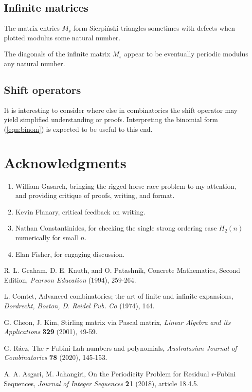 \documentclass[12pt,reqno]{article}
\begin{document}
\subsection{Infinite matrices}
The matrix entries $M_{s}$ form Sierpi\'nski triangles sometimes with defects when plotted modulus some natural number.

The diagonals of the infinite matrix $M_{s}$ appear to be eventually periodic modulus any natural number.
\subsection{Shift operators}
It is interesting to consider where else in combinatorics the shift operator may yield simplified understanding or proofs. Interpreting the binomial form (\ref{eqn:binom}) is expected to be useful to this end. 






\section{Acknowledgments}
\begin{enumerate}
	\item{William Gasarch, bringing the rigged horse race problem to my attention, and providing critique of proofs, writing, and format.}
	\item{Kevin Flanary, critical feedback on writing.}
	\item{Nathan Constantinides, for checking the single strong ordering case $H_{2}(n)$ numerically for small $n$.}
	\item{Elan Fisher, for engaging discussion.}
\end{enumerate}

\begin{thebibliography}{9}

R. L. Graham, D. E. Knuth, and O. Patashnik, Concrete Mathematics, Second Edition, {\em Pearson Education\/} (1994), 259-264. 


L. Comtet, Advanced combinatorics; the art of finite and infinite expansions, {\em Dordrecht, Boston, D. Reidel Pub. Co\/} (1974), 144.

 G. Cheon, J. Kim, Stirling matrix via Pascal matrix, {\em Linear Algebra and its Applications} \textbf{329} (2001), 49-59.

 G. R\'acz, The $r$-Fubini-Lah numbers and polynomials, {\em Australasian Journal of Combinatorics} \textbf{78} (2020), 145-153.

 A. A. Asgari, M. Jahangiri, On the Periodicity Problem for Residual $r$-Fubini Sequences, {\em Journal of Integer Sequences} \textbf{21} (2018), article 18.4.5.


\end{thebibliography}
\end{document}
